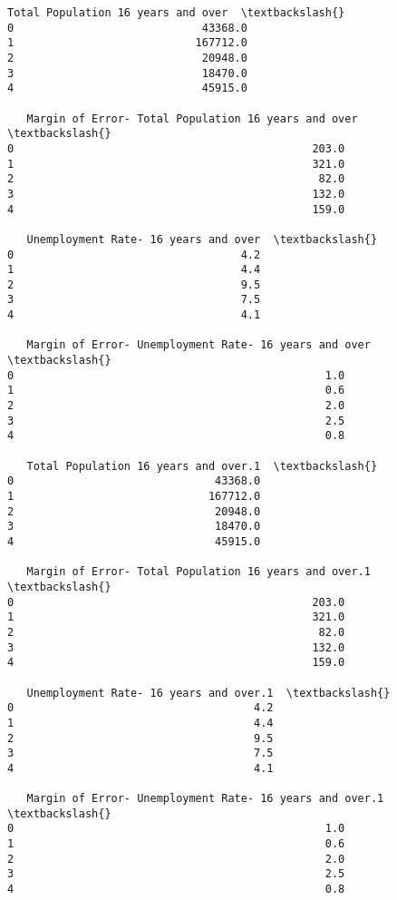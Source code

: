 \documentclass[11pt]{article}
\begin{document}
\begin{tcolorbox}[breakable, size=fbox, boxrule=.5pt, pad at break*=1mm, opacityfill=0]
\begin{Verbatim}[commandchars=\\\{\}]
   Total Population 16 years and over  \textbackslash{}
0                             43368.0
1                            167712.0
2                             20948.0
3                             18470.0
4                             45915.0

   Margin of Error- Total Population 16 years and over  \textbackslash{}
0                                              203.0
1                                              321.0
2                                               82.0
3                                              132.0
4                                              159.0

   Unemployment Rate- 16 years and over  \textbackslash{}
0                                   4.2
1                                   4.4
2                                   9.5
3                                   7.5
4                                   4.1

   Margin of Error- Unemployment Rate- 16 years and over  \textbackslash{}
0                                                1.0
1                                                0.6
2                                                2.0
3                                                2.5
4                                                0.8

   Total Population 16 years and over.1  \textbackslash{}
0                               43368.0
1                              167712.0
2                               20948.0
3                               18470.0
4                               45915.0

   Margin of Error- Total Population 16 years and over.1  \textbackslash{}
0                                              203.0
1                                              321.0
2                                               82.0
3                                              132.0
4                                              159.0

   Unemployment Rate- 16 years and over.1  \textbackslash{}
0                                     4.2
1                                     4.4
2                                     9.5
3                                     7.5
4                                     4.1

   Margin of Error- Unemployment Rate- 16 years and over.1  \textbackslash{}
0                                                1.0
1                                                0.6
2                                                2.0
3                                                2.5
4                                                0.8


\end{Verbatim}
\end{tcolorbox}
\end{document}
